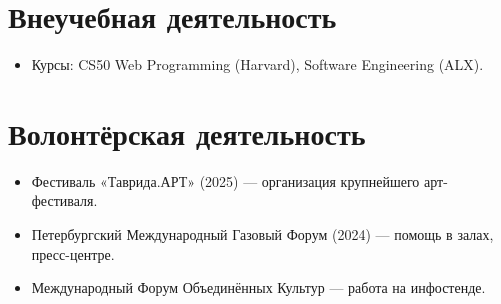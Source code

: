 \documentclass[a4paper,10pt]{article}
\begin{document}
\section*{Внеучебная деятельность}
\begin{itemize}[left=0.5cm]
    \item Курсы: CS50 Web Programming (Harvard), Software Engineering (ALX).
\end{itemize}

\section*{Волонтёрская деятельность}
\begin{itemize}[left=0.5cm]
    \item Фестиваль «Таврида.АРТ» (2025) — организация крупнейшего арт-фестиваля.
    \item Петербургский Международный Газовый Форум (2024) — помощь в залах, пресс-центре.
    \item Международный Форум Объединённых Культур — работа на инфостенде.
\end{itemize}
\end{document}

